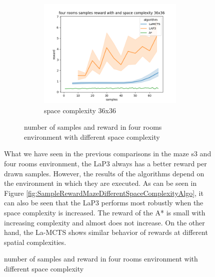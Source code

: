 \documentclass[bibliography=totoc]{scrartcl}
\begin{document}
\begin{figure}[H]
\begin{figure}[H]
	\begin{subfigure}[b]{0.3\linewidth}
		\includegraphics[width=\linewidth]{img/four_rooms_samples__reward_b_8_LAP3_MCTS_AStar_interrupted_36.png}
        \caption{space complexity 36x36}
	\end{subfigure}
	\caption{number of samples and reward in four rooms environment with different space complexity}
	\label{fig:SampleRewardFourRoomsDifferentSpaceComplexity}
\end{figure}

What we have seen in the previous comparisons in the maze s3 and four rooms environment, the \ac{LaP3} always has a better reward per drawn samples.
However, the results of the algorithms depend on the environment in which they are executed.
As can be seen in Figure \ref{fig:SampleRewardMazeDifferentSpaceComplexityAlgo}, it can also be seen that the \ac{LaP3} performs most robustly when the space complexity is increased.
The reward of the A* is small with increasing complexity and almost does not increase.
On the other hand, the \ac{La-MCTS} shows similar behavior of rewards at different spatial complexities.


\end{figure}
\end{document}
